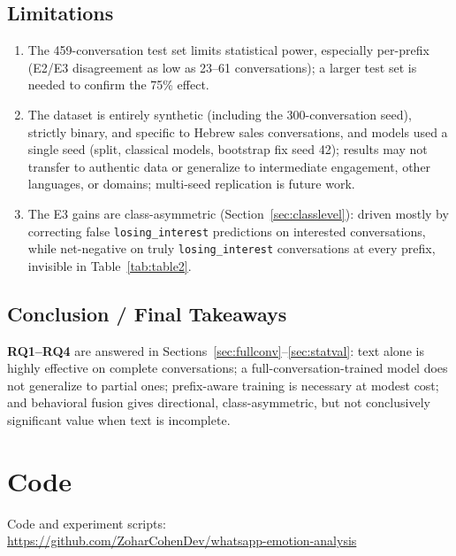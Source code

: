 \documentclass{article}
\begin{document}
\subsection{Limitations}
\label{sec:limitations}

\begin{enumerate}
\item The 459-conversation test set limits statistical power, especially per-prefix (E2/E3 disagreement as low as 23--61 conversations); a larger test set is needed to confirm the 75\% effect.
\item The dataset is entirely synthetic (including the 300-conversation seed), strictly binary, and specific to Hebrew sales conversations, and models used a single seed (split, classical models, bootstrap fix seed 42); results may not transfer to authentic data or generalize to intermediate engagement, other languages, or domains; multi-seed replication is future work.
\item The E3 gains are class-asymmetric (Section~\ref{sec:classlevel}): driven mostly by correcting false \texttt{losing\_interest} predictions on interested conversations, while net-negative on truly \texttt{losing\_interest} conversations at every prefix, invisible in Table~\ref{tab:table2}.
\end{enumerate}

\subsection{Conclusion / Final Takeaways}
\label{sec:conclusion}

\textbf{RQ1--RQ4} are answered in Sections~\ref{sec:fullconv}--\ref{sec:statval}: text alone is highly effective on complete conversations; a full-conversation-trained model does not generalize to partial ones; prefix-aware training is necessary at modest cost; and behavioral fusion gives directional, class-asymmetric, but not conclusively significant value when text is incomplete.

\section{Code}

Code and experiment scripts:\\
\url{https://github.com/ZoharCohenDev/whatsapp-emotion-analysis}



\end{document}
